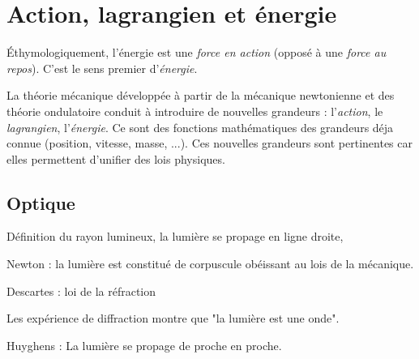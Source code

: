 \section{Action, lagrangien et énergie}
Éthymologiquement, l'énergie est une {\it force en action} (opposé à une {\it force au repos}). C'est le sens premier d'{\it énergie}.

La théorie mécanique développée à partir de la mécanique newtonienne et des théorie ondulatoire conduit à introduire de nouvelles grandeurs : l'{\it action}, le {\it lagrangien}, l'{\it énergie}. Ce sont des fonctions mathématiques des grandeurs déja connue (position, vitesse, masse, ...). Ces nouvelles grandeurs sont pertinentes car elles permettent d'unifier des lois physiques.

\subsection{Optique}

Définition du rayon lumineux, la lumière se propage en ligne droite,

Newton : la lumière est constitué de corpuscule obéissant au lois de la mécanique.

Descartes : loi de la réfraction

Les expérience de diffraction montre que "la lumière est une onde".

Huyghens : La lumière se propage de proche en proche.
